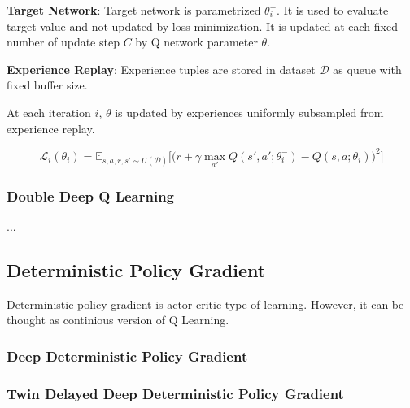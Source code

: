 \textbf{Target Network}: Target network is parametrized $\theta_i^-$. It is used to evaluate target value and not updated by loss minimization. It is updated at each fixed number of update step $C$ by Q network parameter $\theta$. 

\textbf{Experience Replay}: Experience tuples are stored in dataset $\mathcal{D}$ as queue with fixed buffer size. 

At each iteration $i$, $\theta$ is updated by experiences uniformly subsampled from experience replay.

\begin{equation}
\label{eqn:dqn_loss}
\mathcal{L}_i(\theta_i) = \mathbb{E}_{s,a,r,s'\sim U(\mathcal{D})}\Big[\big( r + \gamma \max_{a'} Q(s',a';\theta_i^-) - Q(s,a;\theta_i) \big) ^ 2 \Big]
\end{equation}

\subsubsection{Double Deep Q Learning}

...

\subsection{Deterministic Policy Gradient}
Deterministic policy gradient is actor-critic type of learning. However, it can be thought as continious version of Q Learning.  


\subsubsection{Deep Deterministic Policy Gradient}

\subsubsection{Twin Delayed Deep Deterministic Policy Gradient}